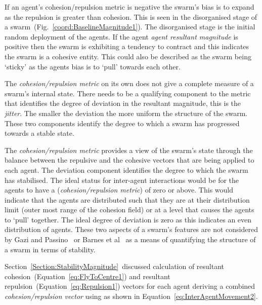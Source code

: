 \documentclass{ieeeaccess}
\begin{document}
If an agent's {cohesion/repulsion metric} is negative the swarm's bias is to
expand as the repulsion is greater than cohesion. This is seen in the
disorganised stage of a swarm~(Fig.~\ref{coord:BaselineMagnitude1}). The
disorganised stage is the initial random deployment of the agents. If the agent
\textit{agent resultant magnitude} is positive then the swarm is exhibiting a
tendency to contract and this indicates the swarm is a cohesive entity. This
could also be described as the swarm being `sticky' as the agents bias is to
`pull' towards each other.

The \textit{cohesion/repulsion metric} on its own does not give a complete
measure of a swarm's internal state. There needs to be a qualifying component
to the metric that identifies the degree of deviation in the resultant
magnitude, this is the \textit{jitter}. The smaller the deviation the more
uniform the structure of the swarm. These two components identify the degree to
which a swarm has progressed towards a stable state.
 
The \textit{cohesion/repulsion metric} provides a view of the swarm's state
through the balance between the repulsive and the cohesive vectors that are
being applied to each agent. The deviation component identifies the degree to
which the swarm has stabilised. The ideal status for inter-agent interactions
would be for the agents to have a (\textit{cohesion/repulsion metric}) of zero
or above. This would indicate that the agents are distributed such that they
are at their distribution limit (outer most range of the cohesion field) or at
a level that causes the agents to `pull' together. The ideal degree of
deviation is zero as this indicates an even distribution of agents. These two
aspects of a swarm's features are not considered by Gazi and
Passino~\cite{GP:11} or Barnes et al~\cite{BFV:07} as a means of quantifying
the structure of a swarm in terms of stability.


Section~\ref{Section:StabilityMagnitude}~discussed calculation of resultant
cohesion~(Equation~\ref{eq:FlyToCentre1}) and resultant
repulsion~(Equation~\ref{eq:Repulsion1}) vectors for each agent deriving a
combined \textit{cohesion/repulsion vector} using as shown in
Equation~\ref{eq:InterAgentMovement2}. 
\end{document}
